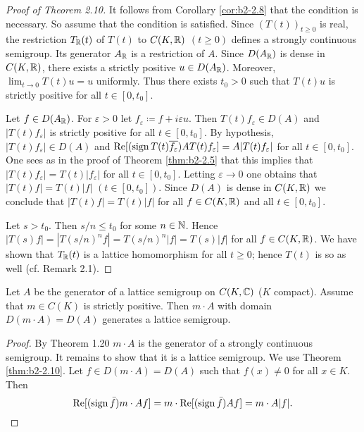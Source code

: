 \begin{proof}[Proof of Theorem 2.10]
It follows from  Corollary \ref{cor:b2-2.8} that the condition is necessary.
So assume that the condition is satisfied.
Since $(T(t))_{t \geq 0}$ is real, the restriction $T_{\mathbb{R}}(t)$ of $T(t)$ to $C(K,\mathbb{R})$ $(t \geq 0)$ defines a strongly continuous semigroup.
Its generator $A_{\mathbb{R}}$ is a restriction of $A$.
Since $D(A_{\mathbb{R}})$ is dense in $C(K,\mathbb{R})$, there exists a strictly positive $u \in D(A_{\mathbb{R}})$.
Moreover, $\lim_{t \to 0} T(t)u = u$ uniformly.
Thus there exists $t_{0} > 0$ such that $T(t)u$ is strictly positive for all $t \in [0,t_{0}]$.
 
Let $f \in D(A_{\mathbb{R}})$.
For $\varepsilon > 0$ let $f_{\varepsilon} \coloneqq f + i\varepsilon u$.
Then $T(t)f_{\varepsilon} \in D(A)$ and $|T(t)f_{\varepsilon}|$ is strictly positive for all $t \in [0,t_{0}]$.
By hypothesis, $|T(t)f_{\varepsilon}| \in D(A)$ and $\mathop{}\!\mathrm{Re}[(\operatorname{sign} T(t)\overline{f_{\varepsilon}})AT(t)f_{\varepsilon}] = A|T(t)f_{\varepsilon}|$ for all $t \in [0,t_{0}]$.
One sees as in the proof of Theorem \ref{thm:b2-2.5} that this implies that $|T(t)f_{\varepsilon}| = T(t)|f_{\varepsilon}|$ for all $t \in [0,t_{0}]$.
Letting $\varepsilon \to 0$ one obtains that $|T(t)f| = T(t)|f|$ $(t \in [0,t_{0}])$.
Since $D(A)$ is dense in $C(K,\mathbb{R})$ we conclude that $|T(t)f| = T(t)|f|$ for all $f \in C(K,\mathbb{R})$ and all $t \in [0,t_{0}]$.

Let $s > t_{0}$.
Then $s/n \leq t_{0}$ for some $n \in \mathbb{N}$.
Hence $|T(s)f| = |T(s/n)^{n}f| = T(s/n)^{n}|f| = T(s)|f|$ for all $f \in C(K,\mathbb{R})$.
We have shown that $T_{\mathbb{R}}(t)$ is a lattice homomorphism for all $t \geq 0$; hence $T(t)$ is so as well (cf. Remark 2.1).
\end{proof}

\begin{corollary}\label{cor:b2-2.11}
Let $A$ be the generator of a lattice semigroup on $C(K,\mathbb{C})$ ($K$ compact).
Assume that  $m \in C(K)$ is strictly positive.
Then  $m \cdot A$ with domain $D(m \cdot A) = D(A)$ generates a lattice semigroup.
\end{corollary}

\begin{proof}
By Theorem 1.20  $m \cdot A$ is the generator of a strongly continuous semigroup.
It remains to show that it is a lattice semigroup.
We use Theorem \ref{thm:b2-2.10}.
Let $f \in D(m \cdot A) = D(A)$ such that $f(x) \neq 0$ for all $x \in K$.
Then 
\[
\mathop{}\!\mathrm{Re}[(\operatorname{sign} \bar{f})m \cdot Af] = m \cdot \mathop{}\!\mathrm{Re}[(\operatorname{sign} \bar{f})Af] = m \cdot A|f|.
\]
\end{proof}

